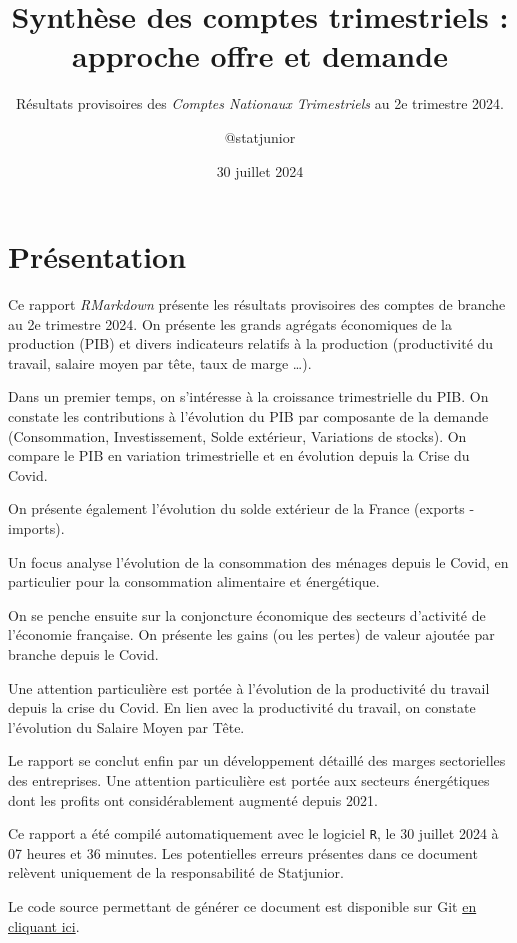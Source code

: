 \documentclass[
]{article}
\title{Synthèse des comptes trimestriels : approche offre et demande}
\subtitle{Résultats provisoires des \emph{Comptes Nationaux
Trimestriels} au 2e trimestre 2024.}
\author{@statjunior}
\date{30 juillet 2024}
\begin{document}
\maketitle

\section{Présentation}\label{pruxe9sentation}

Ce rapport \emph{RMarkdown} présente les résultats provisoires des
comptes de branche au 2e trimestre 2024. On présente les grands agrégats
économiques de la production (PIB) et divers indicateurs relatifs à la
production (productivité du travail, salaire moyen par tête, taux de
marge \ldots).

Dans un premier temps, on s'intéresse à la croissance trimestrielle du
PIB. On constate les contributions à l'évolution du PIB par composante
de la demande (Consommation, Investissement, Solde extérieur, Variations
de stocks). On compare le PIB en variation trimestrielle et en évolution
depuis la Crise du Covid.

On présente également l'évolution du solde extérieur de la France
(exports - imports).

Un focus analyse l'évolution de la consommation des ménages depuis le
Covid, en particulier pour la consommation alimentaire et énergétique.

On se penche ensuite sur la conjoncture économique des secteurs
d'activité de l'économie française. On présente les gains (ou les
pertes) de valeur ajoutée par branche depuis le Covid.

Une attention particulière est portée à l'évolution de la productivité
du travail depuis la crise du Covid. En lien avec la productivité du
travail, on constate l'évolution du Salaire Moyen par Tête.

Le rapport se conclut enfin par un développement détaillé des marges
sectorielles des entreprises. Une attention particulière est portée aux
secteurs énergétiques dont les profits ont considérablement augmenté
depuis 2021.

Ce rapport a été compilé automatiquement avec le logiciel \texttt{R}, le
30 juillet 2024 à 07 heures et 36 minutes. Les potentielles erreurs
présentes dans ce document relèvent uniquement de la responsabilité de
Statjunior.

Le code source permettant de générer ce document est disponible sur Git
\href{https://github.com/statjunior/Statjunior/tree/main/Conjoncture\%20-\%20comptes\%20trimestriels/}{en
cliquant ici}.
\end{document}
